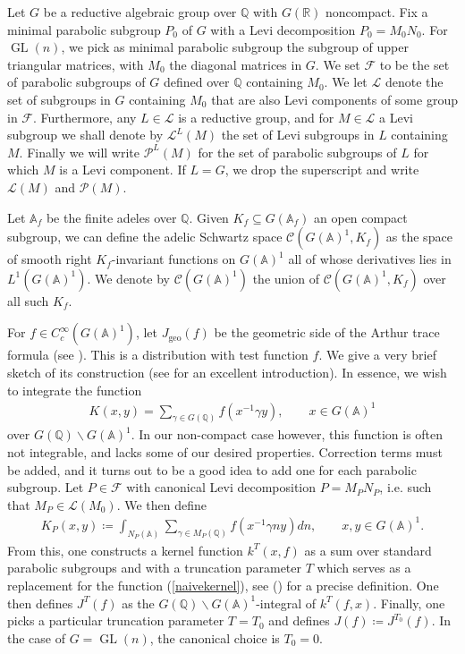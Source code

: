 \documentclass[11pt,reqno]{amsart}
\numberwithin{equation}{section}
\theoremstyle{definition}
\theoremstyle{remark}
\newcommand{\Q}{\mathbb{Q}}
\newcommand{\GL}{\operatorname{GL}}
\newcommand{\geo}{\operatorname{geo}}
\newcommand{\A}{\mathbb{A}}
\newcommand{\R}{\mathbb{R}}
\renewcommand{\subset}{\subseteq}
\begin{document}
Let $G$ be a reductive algebraic group over $\Q$ with $G(\R)$ noncompact. Fix a minimal parabolic subgroup $P_0$ of $G$ with a Levi decomposition $P_0=M_0 N_0$. For $\GL(n)$, we pick as minimal parabolic subgroup the subgroup of upper triangular matrices, with $M_0$ the diagonal matrices in $G$. We set $\mathcal{F}$ to be the set of parabolic subgroups of $G$ defined over $\Q$ containing $M_0$. We let $\mathcal{L}$ denote the set of subgroups in $G$ containing $M_0$ that are also Levi components of some group in $\mathcal{F}$. Furthermore, any $L\in\mathcal{L}$ is a reductive group, and for $M\in\mathcal{L}$ a Levi subgroup we shall denote by $\mathcal{L}^L(M)$ the set of Levi subgroups in $L$ containing $M$. Finally we will write $\mathcal{P}^L(M)$ for the set of parabolic subgroups of $L$ for which $M$ is a Levi component. If $L=G$, we drop the superscript and write $\mathcal{L}(M)$ and $\mathcal{P}(M)$.

Let $\A_f$ be the finite adeles over $\Q$. Given $K_f\subset G(\A_f)$ an open compact subgroup, we can define the adelic Schwartz space $\mathcal{C}(G(\A)^1,K_f)$ as the space of smooth right $K_f$-invariant functions on $G(\A)^1$ all of whose derivatives lies in $L^1(G(\A)^1)$. We denote by $\mathcal{C}(G(\A)^1)$ the union of $\mathcal{C}(G(\A)^1,K_f)$ over all such $K_f$.

For $f\in C_c^\infty(G(\A)^1)$, let $J_{\geo}(f)$ be the geometric side of the Arthur trace formula (see \cite{Arthur2}). This is a distribution with test function $f$. We give a very brief sketch of its construction (see \cite{Arthur0} for an excellent introduction). In essence, we wish to integrate the function
\begin{align}\label{naivekernel}
    K(x,y) = \sum_{\gamma\in G(\Q)}f(x^{-1}\gamma y), \qquad x\in G(\A)^1
\end{align}
over $G(\Q)\backslash G(\A)^1$. In our non-compact case however, this function is often not integrable, and lacks some of our desired properties. Correction terms must be added, and it turns out to be a good idea to add one for each parabolic subgroup. Let $P\in \mathcal{F}$ with canonical Levi decomposition $P=M_PN_P$, i.e. such that $M_P\in \mathcal{L}(M_0)$. We then define
\begin{align*}
    K_P(x,y)\coloneqq\int_{N_P(\A)} \sum_{\gamma\in M_P(\Q)}f(x^{-1}\gamma n y) dn, \qquad x,y\in G(\A)^1.
\end{align*}
From this, one constructs a kernel function $k^T(x,f)$ as a sum over standard parabolic subgroups and with a truncation parameter $T$ which serves as a replacement for the function (\ref{naivekernel}), see (\cite{Arthur2}) for a precise definition. One then defines $J^T(f)$ as the $G(\Q)\backslash G(\A)^1$-integral of $k^T(f,x)$. Finally, one picks a particular truncation parameter $T=T_0$ and defines $J(f)\coloneqq J^{T_0}(f)$. In the case of $G=\GL(n)$, the canonical choice is $T_0 = 0$. 
\end{document}
